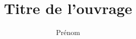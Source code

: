 \documentclass[french,fleqn,allpages]{ouvrage-hermes}
\title{Titre de l'ouvrage}
\author{Prénom \Name{Nom} \\}
\let\oldlistofalgorithms\listofalgorithms
\let\oldnumberline\numberline%
\newcommand{\algnumberline}[1]{#1~}
\renewcommand{\listofalgorithms}{%
  \let\numberline\algnumberline%
  \oldlistofalgorithms
  \let\numberline\oldnumberline%
}
\let\oldinput
\begin{document}
\fontsize{10}{12.5}\selectfont

\maketitle
%
\mainmatter


\cleardoublepage



%






\chapter*{Conclusion}



\printindex
\end{document}
